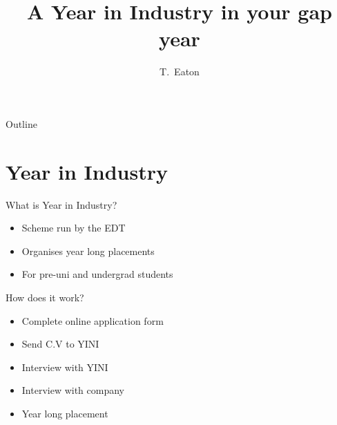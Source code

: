 \documentclass{beamer}
\title[Gap year internship] %
{A Year in Industry in your gap year}
\author[Author] %
{T.~Eaton\inst{1}}
\institute[Company] %
{
  \inst{1}%
  Aerospace Engineering department\\
  LiveLink Technology
  \pnote{Introduce myself}
  \pnote{Old KES student}
  \pnote{Left last year}
  \pnote{Maths physics computer science A level}
}
\date[KES Presentation] %
{\formatdate{13}{11}{2017}}
\begin{document}

\begin{frame}
  \titlepage
\end{frame}

\begin{frame}{Outline}
  \tableofcontents
\end{frame}




\section{Year in Industry}


\begin{frame}{What is Year in Industry?}

  \begin{itemize}
  \item
	  Scheme run by the EDT
  \item
	  Organises year long placements
  \item
	  For pre-uni and undergrad students
  \end{itemize}
\end{frame}

\begin{frame}{How does it work?}
	\begin{itemize}
		\item
			Complete online application form
		\item
			Send C.V to YINI
		\item 
			Interview with YINI
		\item
			Interview with company
		\item
			Year long placement
 	\end{itemize}
\end{frame}
\end{document}

